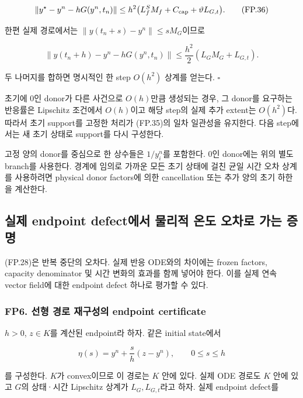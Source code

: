 \documentclass[11pt,a4paper]{article}
\begin{document}
\[
\|y^\star-y^n-hG(y^n,t_n)\|
\le
h^2\bigl(L_f^S M_f+C_{\rm cap}
+\vartheta L_{G,t}\bigr).
\tag{FP.36}
\]

한편 실제 경로에서는 \(\|y(t_n+s)-y^n\|\le sM_G\)이므로

\[
\|y(t_n+h)-y^n-hG(y^n,t_n)\|
\le
\frac{h^2}{2}(L_GM_G+L_{G,t}).
\tag{FP.37}
\]

두 나머지를 합하면 명시적인 한 step \(O(h^2)\) 상계를 얻는다. \(\square\)

초기에 0인 donor가 다른 사건으로 \(O(h)\)만큼 생성되는 경우, 그 donor를 요구하는 반응률은 Lipschitz 조건에서 \(O(h)\)이고 해당 step의 실제 추가 extent는 \(O(h^2)\)다. 따라서 초기 support를 고정한 처리가 (FP.35)의 일차 일관성을 유지한다. 다음 step에서는 새 초기 상태로 support를 다시 구성한다.

고정 양의 donor를 중심으로 한 상수들은 \(1/y_i^n\)를 포함한다. 0인 donor에는 위의 별도 branch를 사용한다. 경계에 임의로 가까운 모든 초기 상태에 걸친 균일 시간 오차 상계를 사용하려면 physical donor factors에 의한 cancellation 또는 추가 양의 초기 하한을 계산한다.

\hypertarget{uxc2e4uxc81c-endpoint-defectuxc5d0uxc11c-uxbb3cuxb9acuxc801-uxc628uxb3c4-uxc624uxcc28uxb85c-uxac00uxb294-uxc99duxba85}{%
\subsection{실제 endpoint defect에서 물리적 온도 오차로 가는 증명}\label{uxc2e4uxc81c-endpoint-defectuxc5d0uxc11c-uxbb3cuxb9acuxc801-uxc628uxb3c4-uxc624uxcc28uxb85c-uxac00uxb294-uxc99duxba85}}

(FP.28)은 반복 중단의 오차다. 실제 반응 ODE와의 차이에는 frozen factors, capacity denominator 및 시간 변화의 효과를 함께 넣어야 한다. 이를 실제 연속 vector field에 대한 endpoint defect 하나로 평가할 수 있다.

\hypertarget{fp6.-uxc120uxd615-uxacbduxb85c-uxc7acuxad6cuxc131uxc758-endpoint-certificate}{%
\subsubsection{FP6. 선형 경로 재구성의 endpoint certificate}\label{fp6.-uxc120uxd615-uxacbduxb85c-uxc7acuxad6cuxc131uxc758-endpoint-certificate}}

\(h>0\), \(z\in K\)를 계산된 endpoint라 하자. 같은 initial state에서

\[
\eta(s)=y^n+\frac{s}{h}(z-y^n),\qquad 0\le s\le h
\tag{FP.38}
\]

를 구성한다. \(K\)가 convex이므로 이 경로는 \(K\) 안에 있다. 실제 ODE 경로도 \(K\) 안에 있고 \(G\)의 상태·시간 Lipschitz 상계가 \(L_G,L_{G,t}\)라고 하자. 실제 endpoint defect를
\end{document}

